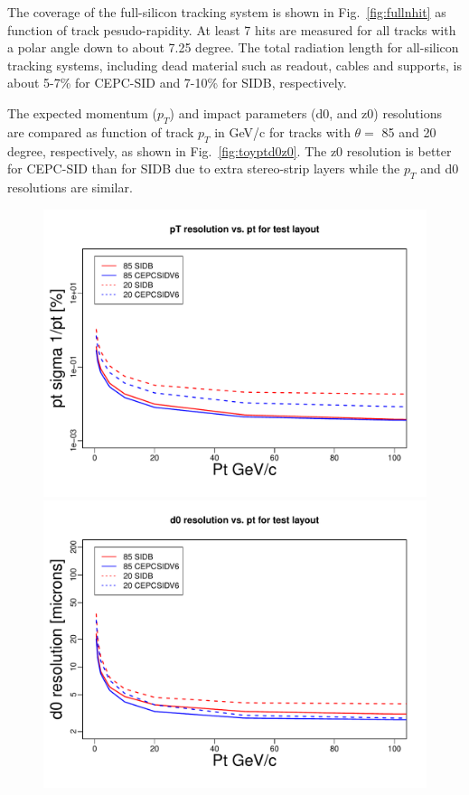 The coverage of the full-silicon tracking system is shown in Fig.~\ref{fig:fullnhit} as function of track pesudo-rapidity. 
At least 7 hits are measured for all tracks with 
a polar angle down to about 7.25 degree. The total radiation length for all-silicon tracking systems, including dead material such as readout,
cables and supports, is about 5-7\% for CEPC-SID and 7-10\% for SIDB, respectively.   
   
The expected momentum ($p_T$) and impact parameters (d0, and z0) resolutions are compared as function of track $p_T$ in GeV/c
for tracks with $\theta =$ 85 and 20 degree, respectively, as shown in Fig.~\ref{fig:toyptd0z0}. The z0 resolution is better for CEPC-SID 
than for SIDB due to extra stereo-strip layers while the $p_T$ and d0 resolutions are similar.

\begin{figure}[hbtp]
\begin{center}
\includegraphics[width=0.32\textheight,keepaspectratio]{Figures/TrackingSystem/FullSilicon/Overlay__ptvsptZ_R.pdf}
\includegraphics[width=0.32\textheight,keepaspectratio]{Figures/TrackingSystem/FullSilicon/Overlay__d0vsptZ_R.pdf}

\end{center}
\end{figure}

